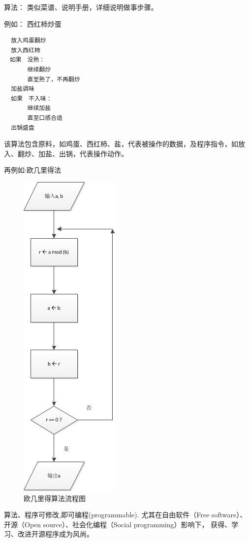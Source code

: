 算法： 类似菜谱、说明手册，详细说明做事步骤。

例如： 西红柿炒蛋

\begin{verbatim}
  放入鸡蛋翻炒
  放入西红柿
　如果　没熟：
　　　　继续翻炒
　　　　直至熟了，不再翻炒
  加盐调味
  如果　不入味：
　　　　继续加盐
　　　　直至口感合适
  出锅盛盘
\end{verbatim}

该算法包含原料，如鸡蛋、西红柿、盐，代表被操作的数据，及程序指令，如放入、翻炒、加盐、出锅，代表操作动作。

再例如:欧几里得法

\begin{figure}
  \centering
  \includegraphics{diagrams/EuclideanAlgorithm.jpeg}
  \caption{欧几里得算法流程图}
\end{figure}

算法、程序可修改,即可编程(programmable). 尤其在自由软件（Free
software）、开源（Open source）、社会化编程（Social programming）影响下，
获得、学习、改进开源程序成为风尚。

